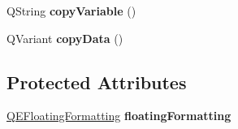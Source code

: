 \begin{DoxyCompactItemize}
\item 
\hypertarget{classQEAnalogProgressBar_aaf75ec001fa29df4dd0d879af066126a}{
QString {\bfseries copyVariable} ()}
\label{classQEAnalogProgressBar_aaf75ec001fa29df4dd0d879af066126a}

\item 
\hypertarget{classQEAnalogProgressBar_a86c24099a9ac78163200c02f9cfd1f9b}{
QVariant {\bfseries copyData} ()}
\label{classQEAnalogProgressBar_a86c24099a9ac78163200c02f9cfd1f9b}

\end{DoxyCompactItemize}
\subsection*{Protected Attributes}
\begin{DoxyCompactItemize}
\item 
\hypertarget{classQEAnalogProgressBar_a309d9a9f7ae1b1e6e69d20b0011a73b8}{
\hyperlink{classQEFloatingFormatting}{QEFloatingFormatting} {\bfseries floatingFormatting}}
\label{classQEAnalogProgressBar_a309d9a9f7ae1b1e6e69d20b0011a73b8}

\end{DoxyCompactItemize}
